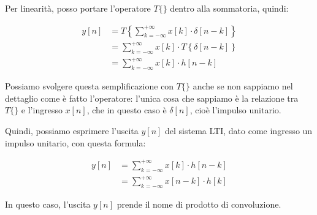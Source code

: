 Per linearità, 
posso portare l'operatore $T \{ \}$ dentro alla sommatoria, quindi: 

{
    \Large 
    \begin{equation}
        \begin{split}
            y \left[ n\right]
            &= 
            T 
            \left\{ 
                \sum_{k = - \infty}^{+ \infty}
                x \left[ k\right]
                \cdot 
                \delta \left[ n - k\right]
            \right\}
            \\
            &=    
            \sum_{k = - \infty}^{+ \infty}
                x \left[ k\right]
                \cdot
                T 
            \left\{  
                \delta \left[ n - k\right]
            \right\}
            \\
            &= 
            \sum_{k = - \infty}^{+ \infty}
            x \left[ k\right]
            \cdot 
            h \left[ n - k \right]
        \end{split}
    \end{equation}
}

\begin{tcolorbox}

Possiamo svolgere questa semplificazione con $T \{ \}$ anche se non sappiamo nel dettaglio come è fatto l'operatore: 
l'unica cosa che sappiamo è la relazione tra $T \{ \}$ e l'ingresso $x \left[ n\right]$, 
che in questo caso è $\delta \left[ n\right]$, cioè l'impulso unitario.
    
\end{tcolorbox}

Quindi, possiamo esprimere l'uscita $y \left[ n\right]$ del sistema LTI, dato come ingresso un impulso unitario, 
con questa formula: 

{
    \Large 
    \begin{equation}
        \begin{split}
        y \left[ n\right]
        &= 
        \sum_{k = - \infty}^{+ \infty}
        x \left[ k\right]
        \cdot 
        h \left[ n - k \right]
        \\
        &= 
        \sum_{k = - \infty}^{+ \infty}
        x \left[ n - k\right]
        \cdot 
        h \left[ k \right]
        \end{split}
    \end{equation}
}

In questo caso, l'uscita $y \left[ n\right]$ prende il nome di prodotto di convoluzione. \newline 

